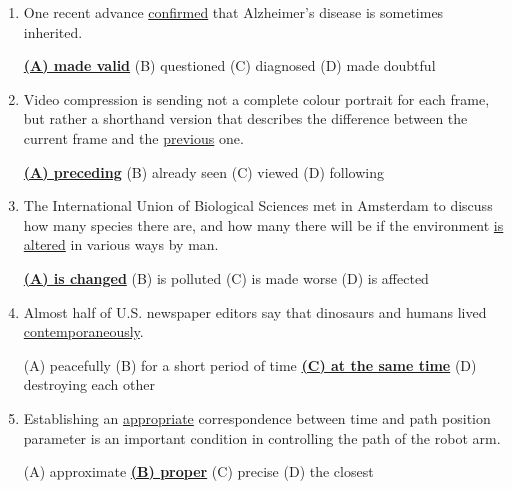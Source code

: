 \documentclass[main.tex]{subfiles}
\begin{document}
\setcounter{section}{100}



\vspace{3mm}

\begin{enumerate}[nosep,leftmargin=*]
	\itemsep10pt
	\item One recent advance \uline{confirmed} that Alzheimer's disease is sometimes inherited.
	
	\uline{\textbf{(A) made valid}} \quad (B) questioned \quad (C) diagnosed \quad (D) made doubtful
	\item Video compression is sending not a complete colour portrait for each frame, but rather a shorthand version that describes the difference between the current frame and the \uline{previous} one.
	
	\uline{\textbf{(A) preceding}} \quad (B) already seen \quad (C) viewed \quad (D) following
	\item The International Union of Biological Sciences met in Amsterdam to discuss how many species there are, and how many there will be if the environment \uline{is altered} in various ways by man.
	
	\uline{\textbf{(A) is changed}} \quad (B) is polluted \quad (C) is made worse \quad (D) is affected
	\item Almost half of U.S. newspaper editors say that dinosaurs and humans lived \uline{contemporaneously}.
	
	(A) peacefully \quad (B) for a short period of time \quad \uline{\textbf{(C) at the same time}} \quad (D) destroying each other
	\item Establishing an \uline{appropriate} correspondence between time and path position parameter is an important condition in controlling the path of the robot arm.
	
	(A) approximate \quad \uline{\textbf{(B) proper}} \quad (C) precise \quad (D) the closest
\end{enumerate}


\vspace{3mm}
\end{document}
